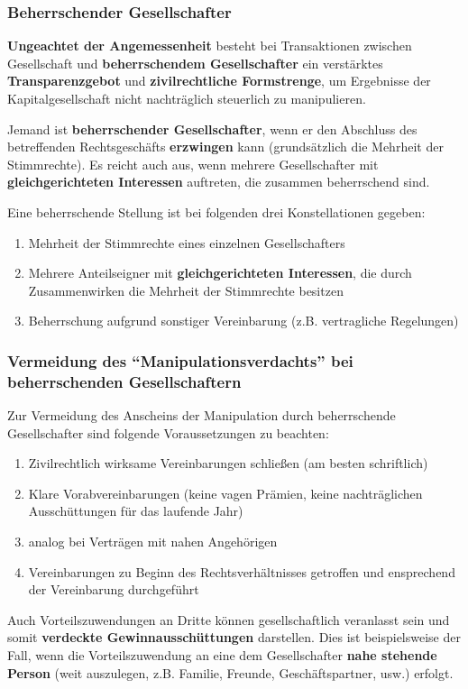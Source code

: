 \documentclass[12pt,A4]{extarticle}
\newcommand{\highlight}[1]{\textcolor{highlightColor}{\textbf{#1}}}
\begin{document}
\subsubsection{Beherrschender Gesellschafter}
\textbf{Ungeachtet der Angemessenheit} besteht bei Transaktionen zwischen Gesellschaft und \textbf{beherrschendem Gesellschafter} ein verstärktes \textbf{Transparenzgebot} und \textbf{zivilrechtliche Formstrenge}, um Ergebnisse der Kapitalgesellschaft nicht nachträglich steuerlich zu manipulieren.\par
Jemand ist \highlight{beherrschender Gesellschafter}, wenn er den Abschluss des betreffenden Rechtsgeschäfts \textbf{erzwingen} kann (grundsätzlich die Mehrheit der Stimmrechte). Es reicht auch aus, wenn mehrere Gesellschafter mit \textbf{gleichgerichteten Interessen} auftreten, die zusammen beherrschend sind.\par
Eine beherrschende Stellung ist bei folgenden drei Konstellationen gegeben:
\begin{enumerate}
  \item{Mehrheit der Stimmrechte eines einzelnen Gesellschafters}
  \item{Mehrere Anteilseigner mit \textbf{gleichgerichteten Interessen}, die durch Zusammenwirken die Mehrheit der Stimmrechte besitzen}
  \item{Beherrschung aufgrund sonstiger Vereinbarung (z.B. vertragliche Regelungen)}
\end{enumerate}

\subsubsection{Vermeidung des ``Manipulationsverdachts'' bei beherrschenden Gesellschaftern}
Zur Vermeidung des Anscheins der Manipulation durch beherrschende Gesellschafter sind folgende Voraussetzungen zu beachten:
\begin{enumerate}
  \item{Zivilrechtlich wirksame Vereinbarungen schließen (am besten schriftlich)}
  \item{Klare Vorabvereinbarungen (keine vagen Prämien, keine nachträglichen Ausschüttungen für das laufende Jahr)}
  \item{analog bei Verträgen mit nahen Angehörigen}
  \item{Vereinbarungen zu Beginn des Rechtsverhältnisses getroffen und ensprechend der Vereinbarung durchgeführt}
\end{enumerate}
Auch Vorteilszuwendungen an Dritte können gesellschaftlich veranlasst sein und somit \textbf{verdeckte Gewinnausschüttungen} darstellen. Dies ist beispielsweise der Fall, wenn die Vorteilszuwendung an eine dem Gesellschafter \textbf{nahe stehende Person} (weit auszulegen, z.B. Familie, Freunde, Geschäftspartner, usw.) erfolgt.
\end{document}
